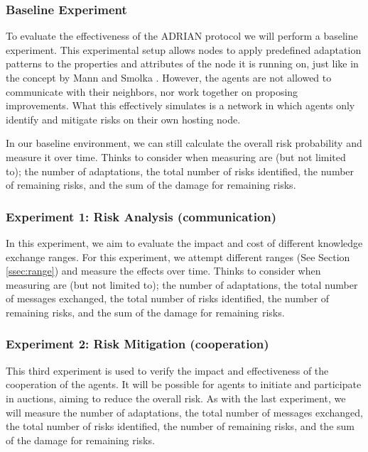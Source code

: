 \subsubsection{Baseline Experiment} 
To evaluate the effectiveness of the ADRIAN protocol we will perform a baseline experiment. This experimental setup allows nodes to apply predefined adaptation patterns to the properties and attributes of the node it is running on, just like in the concept by Mann and Smolka \cite{mann2023ADRIAN}. However, the agents are not allowed to communicate with their neighbors, nor work together on proposing improvements. What this effectively simulates is a network in which agents only identify and mitigate risks on their own hosting node. 

In our baseline environment, we can still calculate the overall risk probability and measure it over time. Thinks to consider when measuring are (but not limited to); the number of adaptations, the total number of risks identified, the number of remaining risks, and the sum of the damage for remaining risks.

\subsubsection{Experiment 1: Risk Analysis (communication)} 
In this experiment, we aim to evaluate the impact and cost of different knowledge exchange ranges. For this experiment, we attempt different ranges (See Section \ref{ssec:range}) and measure the effects over time. Thinks to consider when measuring are (but not limited to); the number of adaptations, the total number of messages exchanged, the total number of risks identified, the number of remaining risks, and the sum of the damage for remaining risks.

\subsubsection{Experiment 2: Risk Mitigation (cooperation)}
This third experiment is used to verify the impact and effectiveness of the cooperation of the agents. It will be possible for agents to initiate and participate in auctions, aiming to reduce the overall risk. As with the last experiment, we will measure the number of adaptations, the total number of messages exchanged, the total number of risks identified, the number of remaining risks, and the sum of the damage for remaining risks.


